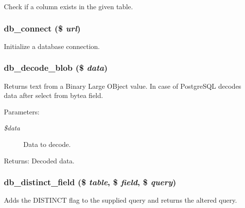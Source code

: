 Check if a column exists in the given table. \hypertarget{group__database_gbc9960ee403664deae1c219015dc5ff2}{
\subsubsection[{db\_\-connect}]{\setlength{\rightskip}{0pt plus 5cm}db\_\-connect (\$ {\em url})}}
\label{group__database_gbc9960ee403664deae1c219015dc5ff2}


Initialize a database connection. \hypertarget{group__database_g1ed4215d202290ca055de8f6cf3b6f08}{
\subsubsection[{db\_\-decode\_\-blob}]{\setlength{\rightskip}{0pt plus 5cm}db\_\-decode\_\-blob (\$ {\em data})}}
\label{group__database_g1ed4215d202290ca055de8f6cf3b6f08}


Returns text from a Binary Large OBject value. In case of PostgreSQL decodes data after select from bytea field.

\begin{Desc}
\item[Parameters:]
\begin{description}
\item[{\em \$data}]Data to decode. \end{description}
\end{Desc}
\begin{Desc}
\item[Returns:]Decoded data. \end{Desc}
\hypertarget{group__database_gf07060b05ac825ab9d7bbb3ece2a699f}{
\subsubsection[{db\_\-distinct\_\-field}]{\setlength{\rightskip}{0pt plus 5cm}db\_\-distinct\_\-field (\$ {\em table}, \/  \$ {\em field}, \/  \$ {\em query})}}
\label{group__database_gf07060b05ac825ab9d7bbb3ece2a699f}


Adds the DISTINCT flag to the supplied query and returns the altered query.

